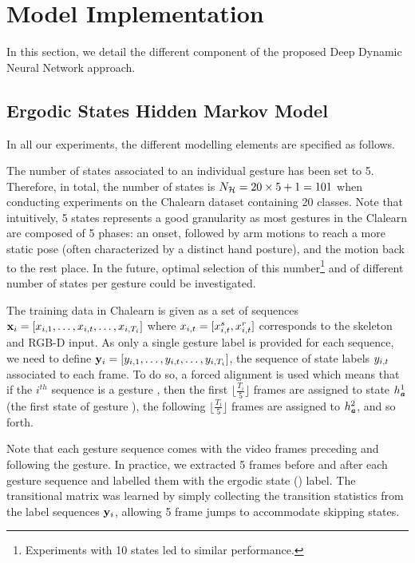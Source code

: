 

\section{Model Implementation}
\label{sec:ModelImplementation}

In this section, we detail the different component of the proposed Deep Dynamic Neural Network approach.

\subsection{Ergodic States Hidden Markov Model}

In all our experiments, the different modelling elements are specified as follows.

The number of states \nsig{} associated to an individual gesture has been set to 5.
Therefore, in total, the number of states is $N_{\mathcal{H}} = 20 \times 5 + 1 = 101$
when conducting  experiments on the Chalearn dataset containing 20 classes.
%
Note that intuitively, 5 states represents a good granularity as
most gestures in the Clalearn are composed of 5 phases: an onset, followed by arm motions to reach a more static pose
(often characterized by a distinct hand posture), and the motion back to the rest place.
%
In the future, optimal selection of this number\footnote{Experiments with 10 states led to similar performance.}
and of different number of states per gesture could be investigated.
%


The training data in Chalearn is given as a set of sequences
$\mathbf x_i=[x_{i,1}, \ldots,x_{i,t},\ldots, x_{i,T_i}]$
where $x_{i,t}=[x_{i,t}^s, x_{i,t}^r]$ corresponds to the skeleton and RGB-D input.
%
As only a single gesture label is provided for each sequence, we need to define
$\mathbf y_i=[y_{i,1}, \ldots,y_{i,t},\ldots, y_{i,T_i}]$,
the sequence of state labels $y_{i,t}$ associated to each frame.
%
To do so, a forced alignment is used which means that if the $i^{th}$ sequence is a gesture \gesturea{}, then the first $\lfloor \frac{T_i}{5} \rfloor$ frames are assigned to state $h_{\textbf{\emph{a}}}^1$ (the first state of gesture \gesturea{}),
the following $\lfloor \frac{T_i}{5} \rfloor$ frames are assigned to $h_{\textbf{\emph{a}}}^2$, and so forth.

Note that each gesture sequence comes with the video frames preceding and following the gesture.
In practice, we extracted 5 frames before and after each gesture sequence and labelled them
with the ergodic state (\ergodicstate) label.
%
The transitional matrix \transitionmatrix{} was learned by simply  collecting the transition statistics from the label sequences $\mathbf y_i$, allowing 5 frame jumps to accommodate skipping states.


